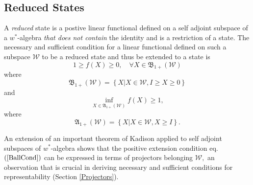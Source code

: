 \documentclass[aps,preprint]{revtex4}%
\begin{document}
\subsection{Reduced States \label{Reduced States}}

A \emph{reduced} state is a postive linear functional defined on a self
adjoint subspace of a $w^{\ast}$-algebra \emph{that does not contain} the
identity and is a restriction of a state. The necessary and sufficient
condition \cite{Segal} for a linear functional defined on such a subspace
$\mathcal{W}$ to be a reduced state and thus be extended to a state is
\begin{equation}
1\geq f\left(  X\right)  \geq0,\quad\forall X\in\mathfrak{B}_{1+}\left(
\mathcal{W}\right)
\end{equation}
where
\begin{equation}
\mathfrak{B}_{1+}\left(  \mathcal{W}\right)  =\left\{  \left.  X\right\vert
X\in\mathcal{W},I\geq X\geq0\right\}  \label{BallCond}%
\end{equation}
and%
\begin{equation}
\inf_{X\in\mathfrak{A}_{1+}\left(  \mathcal{W}\right)  }f\left(  X\right)
\geq1,
\end{equation}
where
\begin{equation}
\mathfrak{A}_{1+}\left(  \mathcal{W}\right)  =\left\{  \left.  X\right\vert
X\in\mathcal{W},X\geq I\right\}  . \label{AnnCon}%
\end{equation}


An extension of an important theorem of Kadison \cite{Kadison} applied to self
adjoint subspaces of $w^{\ast}$-algebra shows that the positive extension
condition eq.$\left(  \ref{BallCond}\right)  $ can be expressed in terms of
projectors belonging $\mathcal{W},$ an observation that is crucial in deriving
necessary and sufficient conditions for representability (Section
\ref{Projectors}).
\end{document}
